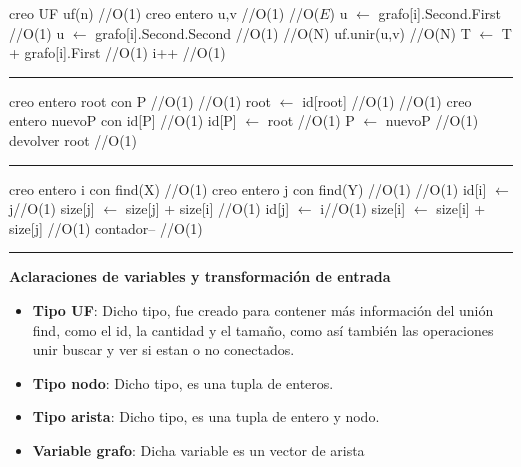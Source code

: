 \begin{algorithm}[H]
\caption{}
\begin{algorithmic}[1]
\state creo UF uf(n) \hfill //O(1)
\state creo entero u,v \hfill //O(1)
 \hfill //O($E$)
\state u $\gets$ grafo[i].Second.First \hfill //O(1)
\state u $\gets$ grafo[i].Second.Second \hfill //O(1)
 \hfill //O(N)
\state uf.unir(u,v) \hfill //O(N)
\state T $\gets$ T + grafo[i].First \hfill //O(1)
\endif
\state i++ \hfill //O(1)
\endwhile
\EndFunction 
\end{algorithmic}
\hrule
\complejidad{  }
\end{algorithm}

\begin{algorithm}[H]
\caption{}
\begin{algorithmic}[1]
\state creo entero root con P \hfill //O(1)
 \hfill //O(1)
\state root $\gets$ id[root] \hfill //O(1)
\endwhile
{} \hfill //O(1)
\state creo entero nuevoP con id[P] \hfill //O(1)
\state id[P] $\gets$ root \hfill //O(1)
\state P $\gets$ nuevoP \hfill //O(1)
\endwhile
\state devolver root \hfill //O(1)
\EndFunction 
\end{algorithmic}
\hrule
{}
\end{algorithm}

\begin{algorithm}[H]
\caption{}
\begin{algorithmic}[1]
\state creo entero i con find(X) \hfill //O(1)
\state creo entero j con find(Y) \hfill //O(1)
 \hfill //O(1)
\state id[i] $\gets$ j\hfill //O(1)
\state size[j] $\gets$ size[j] + size[i] \hfill //O(1)
\Else
\state id[j] $\gets$ i\hfill //O(1)
\state size[i] $\gets$ size[i] + size[j] \hfill //O(1)	
\endif
\state contador-- \hfill //O(1)	
\EndFunction 
\end{algorithmic}
\hrule
{}
\end{algorithm}


\textbf{Aclaraciones de variables y transformaci\'on de entrada}

\begin{itemize}
\item {\bf Tipo UF}: Dicho tipo, fue creado para contener m\'as informaci\'on del uni\'on find, como el id, la cantidad y el tamaño, como as\'i tambi\'en las operaciones unir buscar y ver si estan o no conectados.
\item {\bf Tipo nodo}: Dicho tipo, es una tupla de enteros.
\item {\bf Tipo arista}: Dicho tipo, es una tupla de entero y nodo.
\item {\bf Variable grafo}: Dicha variable es un vector de arista
\end{itemize}  